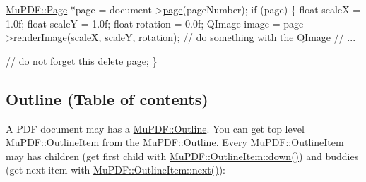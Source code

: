 \begin{DoxyCode}
\hyperlink{class_mu_p_d_f_1_1_page}{MuPDF::Page} *page = document->\hyperlink{class_mu_p_d_f_1_1_document_ab54358660c0054f821728d32fa9fb1ad}{page}(pageNumber);
\textcolor{keywordflow}{if} (page) \{
    \textcolor{keywordtype}{float} scaleX = 1.0f;
    \textcolor{keywordtype}{float} scaleY = 1.0f;
    \textcolor{keywordtype}{float} rotation = 0.0f;
    QImage image = page->\hyperlink{class_mu_p_d_f_1_1_page_abdd1b94b296ea263190b53640168a77b}{renderImage}(scaleX, scaleY, rotation);
    \textcolor{comment}{// do something with the QImage}
    \textcolor{comment}{// ...}

    \textcolor{comment}{// do not forget this}
    \textcolor{keyword}{delete} page;
\}
\end{DoxyCode}
\hypertarget{index_outline}{}\subsection{Outline (\-Table of contents)}\label{index_outline}
A P\-D\-F document may has a \hyperlink{class_mu_p_d_f_1_1_outline}{Mu\-P\-D\-F\-::\-Outline}. You can get top level \hyperlink{class_mu_p_d_f_1_1_outline_item}{Mu\-P\-D\-F\-::\-Outline\-Item} from the \hyperlink{class_mu_p_d_f_1_1_outline}{Mu\-P\-D\-F\-::\-Outline}. Every \hyperlink{class_mu_p_d_f_1_1_outline_item}{Mu\-P\-D\-F\-::\-Outline\-Item} may has children (get first child with \hyperlink{class_mu_p_d_f_1_1_outline_item_a3d74fe1a6ed39127f8326a8cfb4205f3}{Mu\-P\-D\-F\-::\-Outline\-Item\-::down()}) and buddies (get next item with \hyperlink{class_mu_p_d_f_1_1_outline_item_aac4d96f572743aab40916b45861ca914}{Mu\-P\-D\-F\-::\-Outline\-Item\-::next()})\-:


